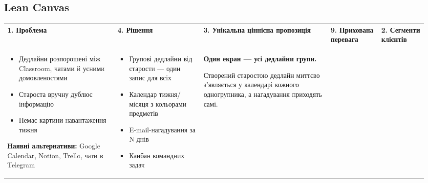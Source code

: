 \documentclass[12pt]{article}
\begin{document}
\begin{landscape}
\section{Lean Canvas}\vspace{-6pt}
\renewcommand{\arraystretch}{1.0}\setlength{\tabcolsep}{4pt}
\footnotesize
\setlength{\extrarowheight}{0pt}
\begin{tabularx}{\linewidth}{|Y|Y|Y|Y|Y|}
\hline
{}\textbf{1. Проблема} & \textbf{4. Рішення} & \textbf{3. Унікальна ціннісна пропозиція} & \textbf{9. Прихована перевага} & \textbf{2. Сегменти клієнтів}\\
\hline
\begin{itemize}[leftmargin=1em,nosep]
\item Дедлайни розпорошені між Classroom, чатами й усними домовленостями
\item Староста вручну дублює інформацію
\item Немає картини навантаження тижня
\end{itemize}
\textbf{Наявні альтернативи:} Google Calendar, Notion, Trello, чати в Telegram
&
\begin{itemize}[leftmargin=1em,nosep]
\item Групові дедлайни від старости --- один запис для всіх
\item Календар тижня/місяця з кольорами предметів
\item E-mail-нагадування за N днів
\item Канбан командних задач
\end{itemize}
&
\textbf{Один екран --- усі дедлайни групи.}

Створений старостою дедлайн миттєво з'являється у календарі кожного одногрупника, а нагадування приходять самі.


\end{tabularx}
\end{landscape}
\end{document}
